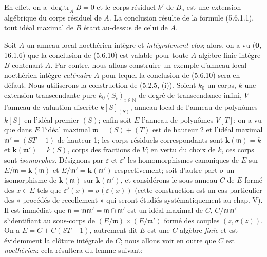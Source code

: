 En effet, on a $\operatorname{deg.tr}_A B=0$ et le corps résiduel $k'$ de
$B_{\mathfrak n}$ est une extension algébrique du corps résiduel de
$A$. La conclusion résulte de la formule (5.6.1.1), tout idéal maximal de
$B$ étant au-dessus de celui de $A$.

\begin{example}[5.6.11]
\label{IV.2.s5.6.11-fr}
Soit $A$ un anneau local noethérien intègre et \emph{intégralement clos}; alors, on
a vu (\textbf{0}, 16.1.6) que la conclusion de (5.6.10) est valable pour toute
$A$-algèbre finie intègre $B$ contenant $A$. Par contre, nous allons
construire un exemple d'anneau local noethérien intègre \emph{caténaire} $A$ pour
lequel la conclusion de (5.6.10) sera en défaut. Nous utiliserons la
construction de (5.2.5, (i)). Soient $k_0$ un corps, $k$ une extension
transcendante pure $k_0(S_i)_{i\in\mathbb N}$ de degré de transcendance
infini, $V$ l'anneau de valuation discrète $k[S]_{(S)}$, anneau local de
l'anneau de polynômes $k[S]$ en l'idéal premier $(S)$; enfin soit $E$
l'anneau de polynômes $V[T]$; on a vu que dans $E$ l'idéal maximal
$\mathfrak m=(S)+(T)$ est de hauteur 2 et l'idéal maximal
$\mathfrak m'=(ST-1)$ de hauteur 1;
les corps résiduels correspondants sont $\boldsymbol{k}(\mathfrak m)=k$ et
$\boldsymbol{k}(\mathfrak m')=k(S)$, corps des fractions de $V$; en vertu du choix de
$k$, ces corps sont \emph{isomorphes}. Désignons par $\varepsilon$ et
$\varepsilon'$ les homomorphismes canoniques de $E$ sur
$E/\mathfrak m=\boldsymbol{k}(\mathfrak m)$ et $E/\mathfrak m'=\boldsymbol{k}(\mathfrak m')$
respectivement; soit d'autre part $\sigma$ un isomorphisme de
$\boldsymbol{k}(\mathfrak m)$ sur $\boldsymbol{k}(\mathfrak m')$, et considérons le sous-anneau $C$
de $E$ formé des $x\in E$ tels que
$\varepsilon'(x)=\sigma(\varepsilon(x))$ (cette construction est un cas
particulier des « procédés de recollement » qui seront étudiés
systématiquement au chap. V). Il est immédiat que
$\mathfrak n=\mathfrak m\mathfrak m'=\mathfrak m\cap\mathfrak m'$ est un
idéal maximal de $C$, $C/\mathfrak m\mathfrak m'$ s'identifiant au
sous-corps de $(E/\mathfrak m)\times(E/\mathfrak m')$ formé des couples
$(z,\sigma(z))$. On a $E=C+C(ST-1)$, autrement dit $E$ est une
$C$-algèbre \emph{finie} et est évidemment la clôture intégrale de $C$; nous allons
voir en outre que $C$ est \emph{noethérien}: cela résultera du lemme suivant:


\end{example}
